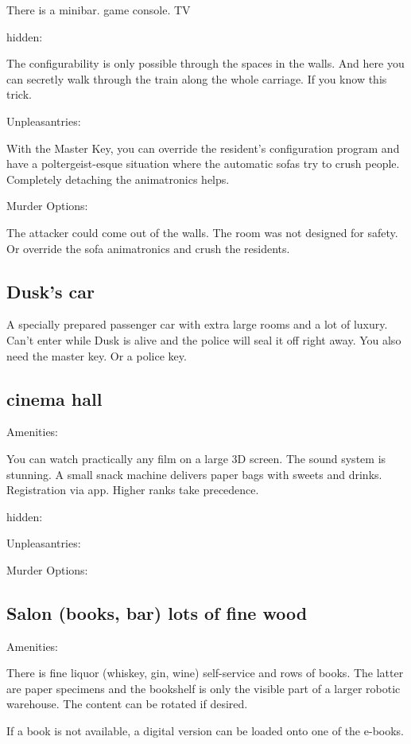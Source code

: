 \documentclass{book}
\begin{document}
There is a minibar. game console. TV

hidden:

The configurability is only possible through the spaces in the walls. And here you can secretly walk through the train along the whole carriage. If you know this trick.

Unpleasantries:

With the Master Key, you can override the resident's configuration program and have a poltergeist-esque situation where the automatic sofas try to crush people. Completely detaching the animatronics helps.

Murder Options:

The attacker could come out of the walls. The room was not designed for safety.
Or override the sofa animatronics and crush the residents.

\subsection{Dusk's car}


A specially prepared passenger car with extra large rooms and a lot of luxury. Can't enter while Dusk is alive and the police will seal it off right away. You also need the master key. Or a police key.

\subsection{cinema hall}


Amenities:

You can watch practically any film on a large 3D screen. The sound system is stunning. A small snack machine delivers paper bags with sweets and drinks.
Registration via app. Higher ranks take precedence.

hidden:

Unpleasantries:

Murder Options:

\subsection{Salon (books, bar) lots of fine wood}

Amenities:

There is fine liquor (whiskey, gin, wine) self-service and rows of books. The latter are paper specimens and the bookshelf is only the visible part of a larger robotic warehouse. The content can be rotated if desired.

If a book is not available, a digital version can be loaded onto one of the e-books.
\end{document}
